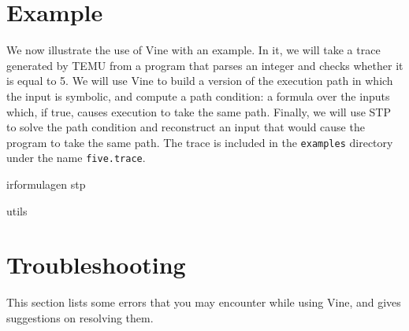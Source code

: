\documentclass[11pt,onecolumn]{article}
\begin{document}




\section{Example}

We now illustrate the use of Vine with an example.
%
In it, we will take a trace generated by TEMU from a program that
parses an integer and checks whether it is equal to 5.
%
We will use Vine to build a version of the execution path in which the
input is symbolic, and compute a path condition: a formula over the
inputs which, if true, causes execution to take the same path.
%
Finally, we will use STP to solve the path condition and reconstruct
an input that would cause the program to take the same path.
%
The trace is included in the {\tt examples} directory under the name
{\tt five.trace}.

 {irformulagen}
 {stp}

 {utils}

\section{Troubleshooting}

This section lists some errors that you may encounter while using
Vine, and gives suggestions on resolving them.
\end{document}
